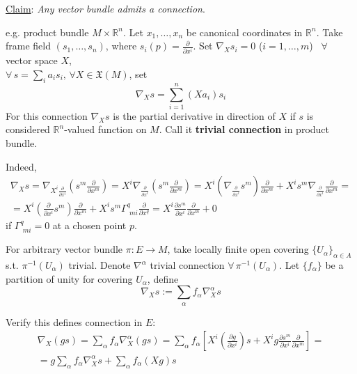 \underline{Claim}: \emph{Any vector bundle admits a connection}.

e.g. product bundle $M\times \mathbb{R}^n$. Let $x_1, \dots , x_n$ be canonical coordinates in $\mathbb{R}^n$. Take frame field $(s_1, \dots, s_n)$, where $s_i(p) = \frac{\partial}{\partial x^i}$. Set $\nabla_X s_i =0 $ ($i=1,\dots , m$) \quad \, $\forall \, $ vector space $X$, \\
$\forall \, s = \sum_i a_i s_i, \, \forall X \in \mathfrak{X}(M)$, set 
\[
\nabla_X s = \sum_{i=1}^n (Xa_i) s_i
\]
For this connection $\nabla_Xs$ is the partial derivative in direction of $X$ if $s$ is considered $\mathbb{R}^n$-valued function on $M$. Call it \textbf{trivial connection} in product bundle.

Indeed,
\[
\begin{gathered}
	\nabla_X s = \nabla_{ X^i \frac{\partial}{\partial x^i}} \left( s^m \frac{\partial}{\partial x^m} \right) = X^i \nabla_{ \frac{\partial}{\partial x^i} } \left( s^m \frac{\partial}{\partial x^m} \right) = X^i \left( \nabla_{ \frac{\partial}{\partial x^i} } s^m \right) \frac{\partial}{\partial x^m} + X^i s^m \nabla_{ \frac{\partial}{\partial x^i} } \frac{\partial}{\partial x^m} = \\	
		= X^i \left( \frac{\partial}{\partial x^i} s^m \right) \frac{\partial}{\partial x^m} + X^i s^m \Gamma^q_{ \, \, mi} \frac{\partial}{\partial x^q} = X^i \frac{ \partial s^m}{ \partial x^i} \frac{\partial }{ \partial x^m } + 0 
\end{gathered}
\]
if $\Gamma^q_{ \, \, mi} =0$ at a chosen point $p$.

For arbitrary vector bundle $\pi : E \to M$, take locally finite open covering $\lbrace U_{\alpha} \rbrace_{\alpha \in A}$ s.t. $\pi^{-1}(U_{\alpha})$ trivial. Denote $\nabla^{\alpha} $ trivial connection $\forall \, \pi^{-1}(U_{\alpha})$. Let $\lbrace f_{\alpha} \rbrace$ be a partition of unity for covering $U_{\alpha}$, define 
	\[
	\nabla_X s := \sum_{\alpha} f_{\alpha} \nabla_X^{\alpha} s
	\]

Verify this defines connection in $E$:
\[
\begin{gathered}
\nabla_X(gs) = \sum_{\alpha} f_{\alpha} \nabla^{\alpha}_X(gs) = \sum_{\alpha} f_{\alpha} \left[ X^i \left( \frac{\partial g}{\partial x^i} \right) s + X^i g \frac{\partial s^m}{\partial x^i} \frac{\partial}{\partial x^m} \right] = \\
= g \sum_{\alpha} f_{\alpha} \nabla_X^{\alpha} s + \sum_{\alpha} f_{\alpha} (Xg) s
\end{gathered}
\]

